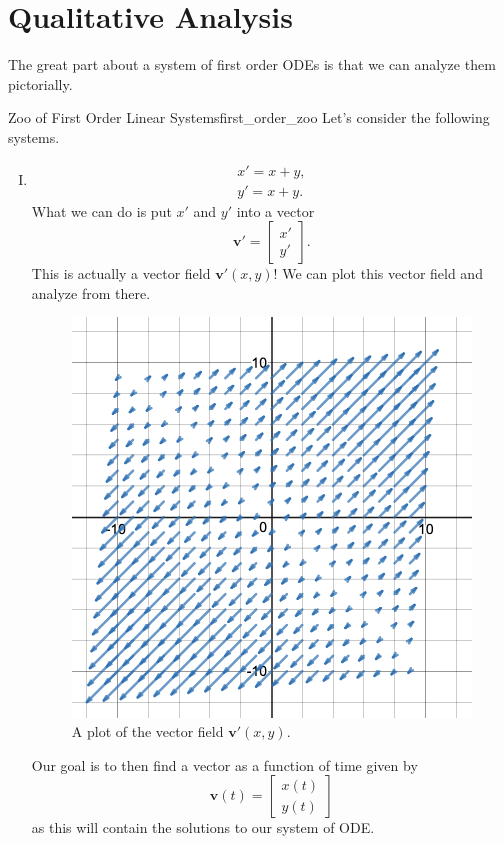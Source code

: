         \section{Qualitative Analysis}
        The great part about a system of first order ODEs is that we can analyze them pictorially. 
        
        \begin{ex}{Zoo of First Order Linear Systems}{first_order_zoo}
        Let's consider the following systems.
        
        \begin{enumerate}[(I)]
            \item 
            \begin{align*}
                x' = x+y,\\
                y' = x+y.
            \end{align*}
            What we can do is put $x'$ and $y'$ into a vector 
            \[
            \mathbf{v}' = \begin{bmatrix} x' \\ y' \end{bmatrix}.
            \]
            This is actually a vector field $\mathbf{v}'(x,y)$!  We can plot this vector field and analyze from there.
            \begin{figure}[H]
                \centering
                \includegraphics[width=.6\textwidth]{Figures_Part_7/x+yx+y.png}
                \caption{A plot of the vector field $\mathbf{v}'(x,y)$.}
            \end{figure}
            Our goal is to then find a vector as a function of time given by
            \[
            \mathbf{v}(t) = \begin{bmatrix} x(t) \\ y(t) \end{bmatrix}
            \]
            as this will contain the solutions to our system of ODE.
            

\end{enumerate}
\end{ex}
